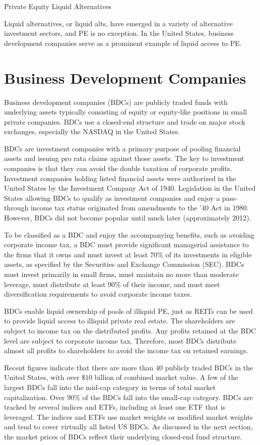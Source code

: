 \documentclass[11pt]{article}
\begin{document}
Private Equity Liquid Alternatives

Liquid alternatives, or liquid alts, have emerged in a variety of alternative investment sectors, and PE is no exception. In the United States, business development companies serve as a prominent example of liquid access to PE.

\section*{Business Development Companies}
Business development companies (BDCs) are publicly traded funds with underlying assets typically consisting of equity or equity-like positions in small private companies. BDCs use a closed-end structure and trade on major stock exchanges, especially the NASDAQ in the United States.

BDCs are investment companies with a primary purpose of pooling financial assets and issuing pro rata claims against those assets. The key to investment companies is that they can avoid the double taxation of corporate profits. Investment companies holding listed financial assets were authorized in the United States by the Investment Company Act of 1940. Legislation in the United States allowing BDCs to qualify as investment companies and enjoy a pass-through income tax status originated from amendments to the '40 Act in 1980. However, BDCs did not become popular until much later (approximately 2012).

To be classified as a BDC and enjoy the accompanying benefits, such as avoiding corporate income tax, a BDC must provide significant managerial assistance to the firms that it owns and must invest at least $70 \%$ of its investments in eligible assets, as specified by the Securities and Exchange Commission (SEC). BDCs must invest primarily in small firms, must maintain no more than moderate leverage, must distribute at least $90 \%$ of their income, and must meet diversification requirements to avoid corporate income taxes.

BDCs enable liquid ownership of pools of illiquid PE, just as REITs can be used to provide liquid access to illiquid private real estate. The shareholders are subject to income tax on the distributed profits. Any profits retained at the BDC level are subject to corporate income tax. Therefore, most BDCs distribute almost all profits to shareholders to avoid the income tax on retained earnings.

Recent figures indicate that there are more than 40 publicly traded BDCs in the United States, with over $\$ 10$ billion of combined market value. A few of the largest BDCs fall into the mid-cap category in terms of total market capitalization. Over $90 \%$ of the BDCs fall into the small-cap category. BDCs are tracked by several indices and ETFs, including at least one ETF that is leveraged. The indices and ETFs use market weights or modified market weights and tend to cover virtually all listed US BDCs. As discussed in the next section, the market prices of BDCs reflect their underlying closed-end fund structure.
\end{document}
